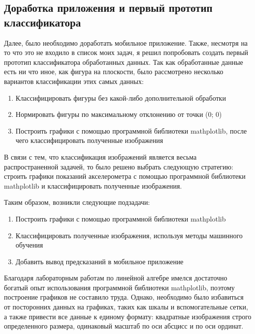 \subsection{Доработка приложения и первый прототип классификатора}
Далее, было необходимо доработать мобильное приложение. Также, несмотря на то что это не входило в список моих задач, я решил попробовать создать первый прототип классификатора обработанных данных.
Так как обработанные данные есть ни что иное, как фигура на плоскости, было рассмотрено несколько вариантов классификации этих самых данных:
\begin{enumerate}
    \item Классифицировать фигуры без какой-либо дополнительной обработки
    \item Нормировать фигуры по максимальному отклонению от точки (0; 0)
    \item Построить графики с помощью программной библиотеки mathplotlib, после чего классифицировать полученные изображения
\end{enumerate}
В связи с тем, что классификация изображений является весьма распространенной задачей, то было решено выбрать следующую стратегию: строить графики показаний акселерометра с помощью программной библиотеки mathplotlib и классифицировать полученные изображения.

Таким образом, возникли следующие подзадачи:
\begin{enumerate}
    \item Построить графики с помощью программной библиотеки mathplotlib
    \item Классифицировать полученные изображения, используя методы машинного обучения
    \item Добавить вывод предсказаний в мобильное приложение
\end{enumerate}
Благодаря лабораторным работам по линейной алгебре имелся достаточно богатый опыт использования программной библиотеки mathplotlib, поэтому построение графиков не составило труда. Однако, необходимо было избавиться от посторонних данных на графиках, таких как шкалы и вспомогательные сетки, а также привести все данные к единому формату: квадратные изображения строго определенного размера, одинаковый масштаб по оси абсцисс и по оси ординат.

